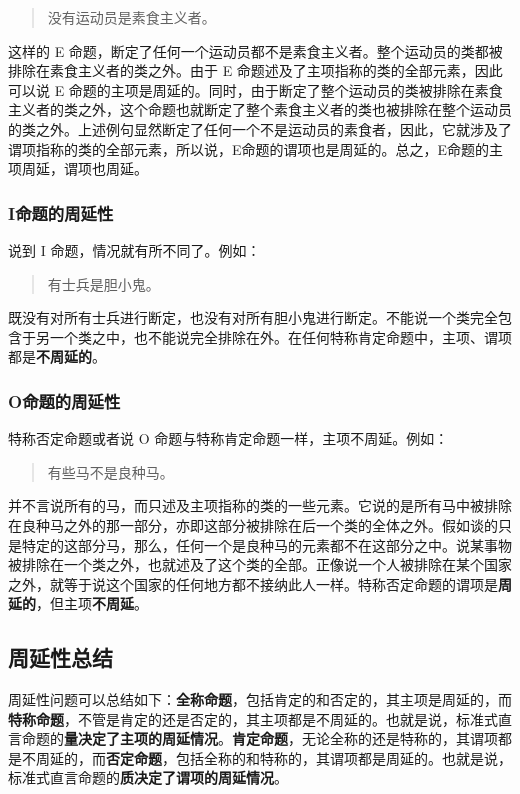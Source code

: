 \begin{quote}
没有运动员是素食主义者。
\end{quote}

这样的 E 命题，断定了任何一个运动员都不是素食主义者。整个运动员的类都被排除在素食主义者的类之外。由于 E 命题述及了主项指称的类的全部元素，因此可以说 E 命题的主项是周延的。同时，由于断定了整个运动员的类被排除在素食主义者的类之外，这个命题也就断定了整个素食主义者的类也被排除在整个运动员的类之外。上述例句显然断定了任何一个不是运动员的素食者，因此，它就涉及了谓项指称的类的全部元素，所以说，E命题的谓项也是周延的。总之，E命题的主项周延，谓项也周延。

\subsubsection{I命题的周延性}
说到 I 命题，情况就有所不同了。例如：

\begin{quote}
有士兵是胆小鬼。
\end{quote}

既没有对所有士兵进行断定，也没有对所有胆小鬼进行断定。不能说一个类完全包含于另一个类之中，也不能说完全排除在外。在任何特称肯定命题中，主项、谓项都是\textbf{不周延的}。

\subsubsection{O命题的周延性}
特称否定命题或者说 O 命题与特称肯定命题一样，主项不周延。例如：

\begin{quote}
有些马不是良种马。
\end{quote}

并不言说所有的马，而只述及主项指称的类的一些元素。它说的是所有马中被排除在良种马之外的那一部分，亦即这部分被排除在后一个类的全体之外。假如谈的只是特定的这部分马，那么，任何一个是良种马的元素都不在这部分之中。说某事物被排除在一个类之外，也就述及了这个类的全部。正像说一个人被排除在某个国家之外，就等于说这个国家的任何地方都不接纳此人一样。特称否定命题的谓项是\textbf{周延的}，但主项\textbf{不周延}。

\subsection{周延性总结}
周延性问题可以总结如下：\textbf{全称命题}，包括肯定的和否定的，其主项是周延的，而\textbf{特称命题}，不管是肯定的还是否定的，其主项都是不周延的。也就是说，标准式直言命题的\textbf{量决定了主项的周延情况}。\textbf{肯定命题}，无论全称的还是特称的，其谓项都是不周延的，而\textbf{否定命题}，包括全称的和特称的，其谓项都是周延的。也就是说，标准式直言命题的\textbf{质决定了谓项的周延情况}。

